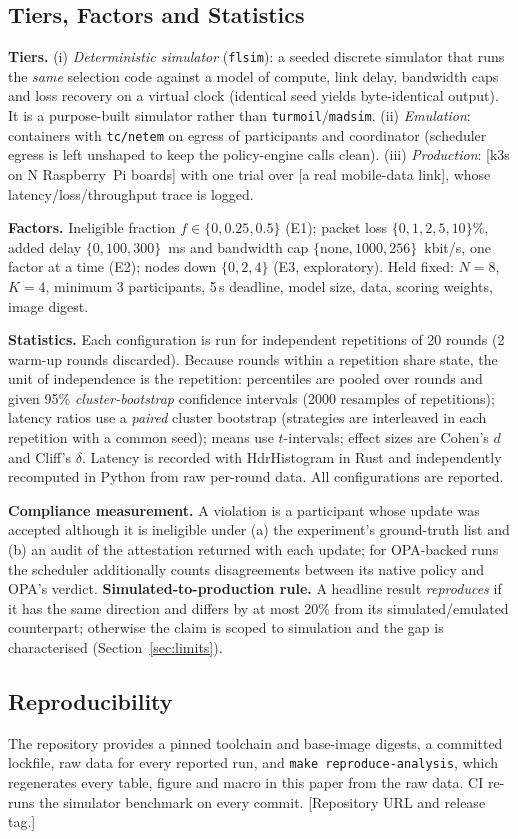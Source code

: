 \subsection{Tiers, Factors and Statistics}
\textbf{Tiers.} (i) \emph{Deterministic simulator} (\texttt{flsim}): a seeded discrete simulator that runs the \emph{same}
selection code against a model of compute, link delay, bandwidth caps and loss recovery on a virtual clock (identical
seed yields byte-identical output). It is a purpose-built simulator rather than \texttt{turmoil}/\texttt{madsim}. (ii)
\emph{Emulation}: containers with \texttt{tc/netem} on egress of participants and coordinator (scheduler egress is left
unshaped to keep the policy-engine calls clean). (iii) \emph{Production}: [k3s on N Raspberry~Pi boards] with one trial
over [a real mobile-data link], whose latency/loss/throughput trace is logged.

\textbf{Factors.} Ineligible fraction $f\in\{0,0.25,0.5\}$ (E1); packet loss $\{0,1,2,5,10\}\%$, added delay
$\{0,100,300\}$~ms and bandwidth cap $\{\text{none},1000,256\}$~kbit/s, one factor at a time (E2); nodes down
$\{0,2,4\}$ (E3, exploratory). Held fixed: $N{=}8$, $K{=}4$, minimum 3 participants, 5\,s deadline, model size, data, scoring weights, image digest.

\textbf{Statistics.} Each configuration is run for \NumReps{} independent repetitions of 20 rounds (2 warm-up rounds
discarded). Because rounds within a repetition share state, the unit of independence is the repetition: percentiles
are pooled over rounds and given 95\% \emph{cluster-bootstrap} confidence intervals (2000 resamples of repetitions);
latency ratios use a \emph{paired} cluster bootstrap (strategies are interleaved in each repetition with a common seed);
means use $t$-intervals; effect sizes are Cohen's $d$ and Cliff's $\delta$. Latency is recorded with HdrHistogram in
Rust and independently recomputed in Python from raw per-round data. All configurations are reported.

\textbf{Compliance measurement.} A violation is a participant whose update was accepted although it is ineligible
under (a) the experiment's ground-truth list and (b) an audit of the attestation returned with each update; for
OPA-backed runs the scheduler additionally counts disagreements between its native policy and OPA's verdict.
\textbf{Simulated-to-production rule.} A headline result \emph{reproduces} if it has the same direction and differs by at most 20\%
from its simulated/emulated counterpart; otherwise the claim is scoped to simulation and the gap is characterised (Section~\ref{sec:limits}).

\subsection{Reproducibility}
The repository provides a pinned toolchain and base-image digests, a committed lockfile, raw data for every reported
run, and \texttt{make reproduce-analysis}, which regenerates every table, figure and macro in this paper from the raw data.
CI re-runs the simulator benchmark on every commit. [Repository URL and release tag.]
